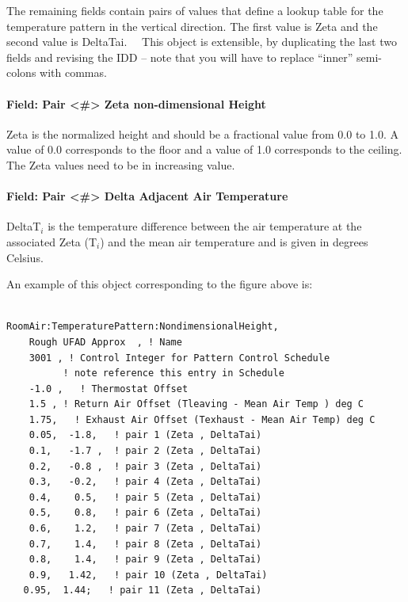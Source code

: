 The remaining fields contain pairs of values that define a lookup table for the temperature pattern in the vertical direction. The first value is Zeta and the second value is DeltaTai.~~ This object is extensible, by duplicating the last two fields and revising the IDD -- note that you will have to replace ``inner'' semi-colons with commas.

\paragraph{Field: Pair \textless{}\#\textgreater{} Zeta non-dimensional Height}\label{field-pair-zeta-non-dimensional-height}

Zeta is the normalized height and should be a fractional value from 0.0 to 1.0. A value of 0.0 corresponds to the floor and a value of 1.0 corresponds to the ceiling. The Zeta values need to be in increasing value.

\paragraph{Field: Pair \textless{}\#\textgreater{} Delta Adjacent Air Temperature}\label{field-pair-delta-adjacent-air-temperature}

DeltaT\(_{i}\) is the temperature difference between the air temperature at the associated Zeta (T\(_{i}\)) and the mean air temperature and is given in degrees Celsius.

An example of this object corresponding to the figure above is:

\begin{lstlisting}

RoomAir:TemperaturePattern:NondimensionalHeight,
    Rough UFAD Approx  , ! Name
    3001 , ! Control Integer for Pattern Control Schedule
          ! note reference this entry in Schedule
    -1.0 ,   ! Thermostat Offset
    1.5 , ! Return Air Offset (Tleaving - Mean Air Temp ) deg C
    1.75,   ! Exhaust Air Offset (Texhaust - Mean Air Temp) deg C
    0.05,  -1.8,   ! pair 1 (Zeta , DeltaTai)
    0.1,   -1.7 ,  ! pair 2 (Zeta , DeltaTai)
    0.2,   -0.8 ,  ! pair 3 (Zeta , DeltaTai)
    0.3,   -0.2,   ! pair 4 (Zeta , DeltaTai)
    0.4,    0.5,   ! pair 5 (Zeta , DeltaTai)
    0.5,    0.8,   ! pair 6 (Zeta , DeltaTai)
    0.6,    1.2,   ! pair 7 (Zeta , DeltaTai)
    0.7,    1.4,   ! pair 8 (Zeta , DeltaTai)
    0.8,    1.4,   ! pair 9 (Zeta , DeltaTai)
    0.9,   1.42,   ! pair 10 (Zeta , DeltaTai)
   0.95,  1.44;   ! pair 11 (Zeta , DeltaTai)
\end{lstlisting}


